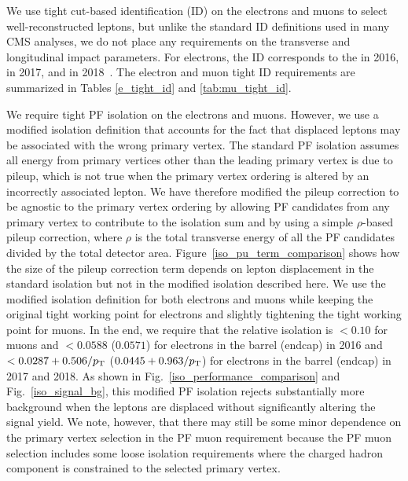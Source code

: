 



We use tight cut-based identification (ID) on the electrons and muons to select well-reconstructed leptons, but unlike the standard ID definitions used in many CMS analyses, we do not place any requirements on the transverse and longitudinal impact parameters. For electrons, the ID corresponds to the  in 2016,  in 2017, and  in 2018~\cite{egammaPOGtightID}. The electron and muon tight ID requirements are summarized in Tables \ref{e_tight_id} and \ref{tab:mu_tight_id}.




We require tight PF isolation on the electrons and muons. However, we use a modified isolation definition that accounts for the fact that displaced leptons may be associated with the wrong primary vertex. The standard PF isolation assumes all energy from primary vertices other than the leading primary vertex is due to pileup, which is not true when the primary vertex ordering is altered by an incorrectly associated lepton. We have therefore modified the pileup correction to be agnostic to the primary vertex ordering by allowing PF candidates from any primary vertex to contribute to the isolation sum and by using a simple $\rho$-based pileup correction, where $\rho$ is the total transverse energy of all the PF candidates divided by the total detector area. Figure~\ref{iso_pu_term_comparison} shows how the size of the pileup correction term depends on lepton displacement in the standard isolation but not in the modified isolation described here. We use the modified isolation definition for both electrons and muons while keeping the original tight working point for electrons and slightly tightening the tight working point for muons. In the end, we require that the relative isolation is $<0.10$ for muons and $<0.0588$ ($0.0571$) for electrons in the barrel (endcap) in 2016 and $<0.0287+0.506/p_{\mathrm{T}}$ ($0.0445+0.963/p_{\mathrm{T}}$) for electrons in the barrel (endcap) in 2017 and 2018. As shown in Fig.~\ref{iso_performance_comparison} and Fig.~\ref{iso_signal_bg}, this modified PF isolation rejects substantially more background when the leptons are displaced without significantly altering the signal yield. We note, however, that there may still be some minor dependence on the primary vertex selection in the PF muon requirement because the PF muon selection includes some loose isolation requirements where the charged hadron component is constrained to the selected primary vertex.

